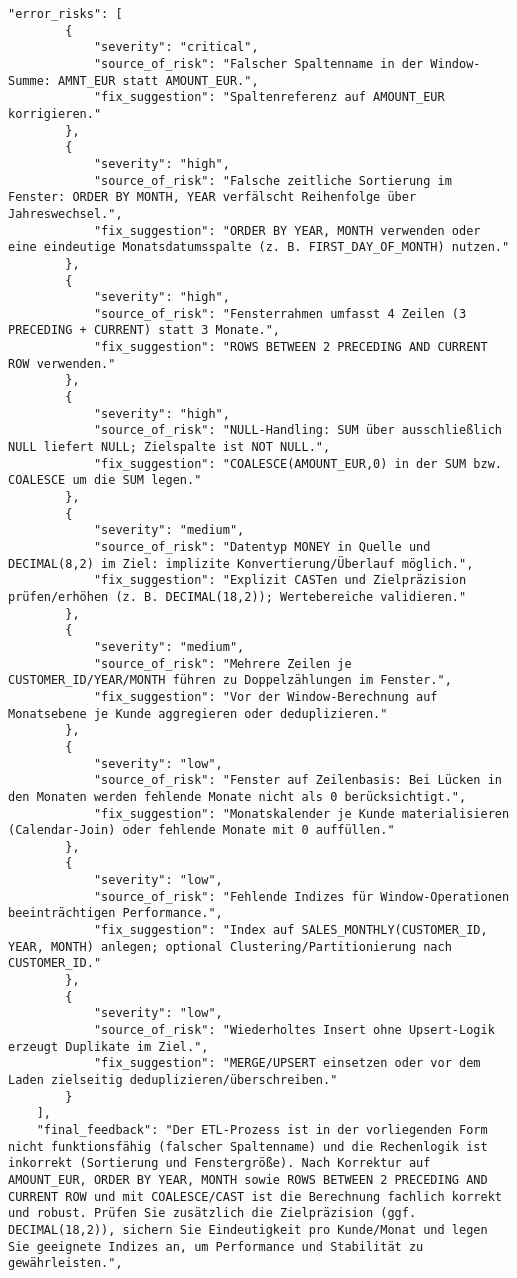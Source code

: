 \begin{lstlisting}[caption={Ausgabe: GPT-5 Anwendungsfall 8 Konsistenzdurchlauf},label={gpt_case8_prompt2}]
    "error_risks": [
        {
            "severity": "critical",
            "source_of_risk": "Falscher Spaltenname in der Window-Summe: AMNT_EUR statt AMOUNT_EUR.",
            "fix_suggestion": "Spaltenreferenz auf AMOUNT_EUR korrigieren."
        },
        {
            "severity": "high",
            "source_of_risk": "Falsche zeitliche Sortierung im Fenster: ORDER BY MONTH, YEAR verfälscht Reihenfolge über Jahreswechsel.",
            "fix_suggestion": "ORDER BY YEAR, MONTH verwenden oder eine eindeutige Monatsdatumsspalte (z. B. FIRST_DAY_OF_MONTH) nutzen."
        },
        {
            "severity": "high",
            "source_of_risk": "Fensterrahmen umfasst 4 Zeilen (3 PRECEDING + CURRENT) statt 3 Monate.",
            "fix_suggestion": "ROWS BETWEEN 2 PRECEDING AND CURRENT ROW verwenden."
        },
        {
            "severity": "high",
            "source_of_risk": "NULL-Handling: SUM über ausschließlich NULL liefert NULL; Zielspalte ist NOT NULL.",
            "fix_suggestion": "COALESCE(AMOUNT_EUR,0) in der SUM bzw. COALESCE um die SUM legen."
        },
        {
            "severity": "medium",
            "source_of_risk": "Datentyp MONEY in Quelle und DECIMAL(8,2) im Ziel: implizite Konvertierung/Überlauf möglich.",
            "fix_suggestion": "Explizit CASTen und Zielpräzision prüfen/erhöhen (z. B. DECIMAL(18,2)); Wertebereiche validieren."
        },
        {
            "severity": "medium",
            "source_of_risk": "Mehrere Zeilen je CUSTOMER_ID/YEAR/MONTH führen zu Doppelzählungen im Fenster.",
            "fix_suggestion": "Vor der Window-Berechnung auf Monatsebene je Kunde aggregieren oder deduplizieren."
        },
        {
            "severity": "low",
            "source_of_risk": "Fenster auf Zeilenbasis: Bei Lücken in den Monaten werden fehlende Monate nicht als 0 berücksichtigt.",
            "fix_suggestion": "Monatskalender je Kunde materialisieren (Calendar-Join) oder fehlende Monate mit 0 auffüllen."
        },
        {
            "severity": "low",
            "source_of_risk": "Fehlende Indizes für Window-Operationen beeinträchtigen Performance.",
            "fix_suggestion": "Index auf SALES_MONTHLY(CUSTOMER_ID, YEAR, MONTH) anlegen; optional Clustering/Partitionierung nach CUSTOMER_ID."
        },
        {
            "severity": "low",
            "source_of_risk": "Wiederholtes Insert ohne Upsert-Logik erzeugt Duplikate im Ziel.",
            "fix_suggestion": "MERGE/UPSERT einsetzen oder vor dem Laden zielseitig deduplizieren/überschreiben."
        }
    ],
    "final_feedback": "Der ETL-Prozess ist in der vorliegenden Form nicht funktionsfähig (falscher Spaltenname) und die Rechenlogik ist inkorrekt (Sortierung und Fenstergröße). Nach Korrektur auf AMOUNT_EUR, ORDER BY YEAR, MONTH sowie ROWS BETWEEN 2 PRECEDING AND CURRENT ROW und mit COALESCE/CAST ist die Berechnung fachlich korrekt und robust. Prüfen Sie zusätzlich die Zielpräzision (ggf. DECIMAL(18,2)), sichern Sie Eindeutigkeit pro Kunde/Monat und legen Sie geeignete Indizes an, um Performance und Stabilität zu gewährleisten.",

\end{lstlisting}

